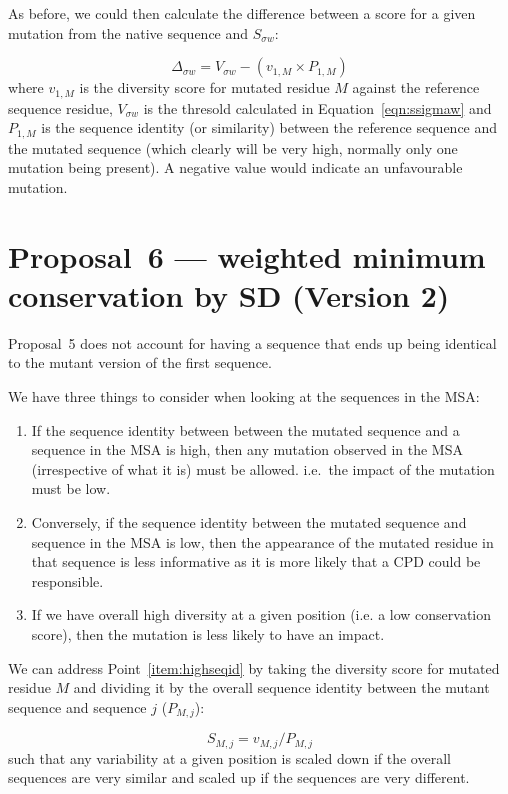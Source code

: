 \documentclass[a4paper]{article}
\begin{document}
As before, we could then calculate the difference between a score for
a given mutation from the native sequence and $S_{\sigma w}$:

\begin{equation}
  \Delta_{\sigma w} = V_{\sigma w} - (v_{1, M} \times P_{1, M})
\end{equation}
where $v_{1,M}$ is the diversity score for mutated residue $M$ against
the reference sequence residue, $V_{\sigma w}$ is the thresold
calculated in Equation~\ref{eqn:ssigmaw} and $P_{1,M}$ is the sequence
identity (or similarity) between the reference sequence and the
mutated sequence (which clearly will be very high, normally only one
mutation being present). A negative value would indicate an
unfavourable mutation.


\section{Proposal~6 --- weighted minimum conservation by SD (Version 2)}
Proposal~5 does not account for having a sequence that ends up being
identical to the mutant version of the first sequence.

We have three things to consider when looking at the sequences in the MSA:
\begin{enumerate}
  \item \label{item:highseqid} If the sequence identity between
    between the mutated sequence and a sequence in the MSA is high,
    then any mutation observed in the MSA (irrespective of what it is)
    must be allowed.  i.e.\ the impact of the mutation must be low.
  \item \label{item:lowseqid} Conversely, if the sequence identity between the
    mutated sequence and sequence in the MSA is low, then the
    appearance of the mutated residue in that sequence is less
    informative as it is more likely that a CPD could be responsible.
  \item If we have overall high diversity at a given position (i.e. a
    low conservation score), then the mutation is less likely to have
    an impact.
\end{enumerate}

We can address Point~\ref{item:highseqid}  by
taking the diversity score for mutated residue $M$ and dividing it by
the overall sequence identity between the mutant sequence and sequence
$j$ ($P_{M, j}$):

\begin{equation}
  S_{M,j} = v_{M, j} / P_{M, j}
\end{equation}
such that any variability at a given position is scaled down if the
overall sequences are very similar and scaled up if the sequences are
very different.
\end{document}
